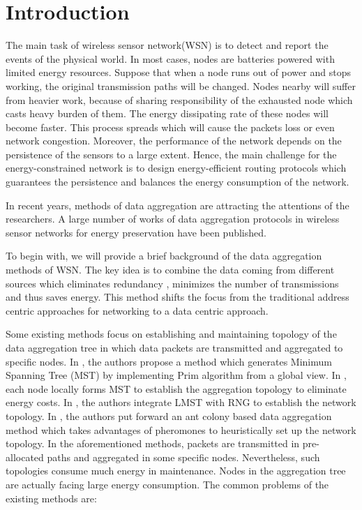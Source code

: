 \documentclass{elsarticle}
\begin{document}
\section{Introduction} \label{introduction}
The main task of wireless sensor network(WSN) \cite{label-19, label-20} is to detect and report the events of the physical world. In most cases, nodes are batteries powered \cite{label-21} with limited energy resources. Suppose that when a node runs out of power and stops working, the original transmission paths will be changed. Nodes nearby will suffer from heavier work, because of sharing responsibility of the exhausted node which casts heavy burden of them. The energy dissipating rate of these nodes will become faster. This process spreads which will cause the packets loss or even network congestion. Moreover, the performance of the network depends on the persistence of the sensors to a large extent. Hence, the main challenge for the energy-constrained network is to design energy-efficient routing protocols \cite{label-1, label-2, label-3, label-4, label-5} which guarantees the persistence and balances the energy consumption of the network.

In recent years, methods of data aggregation \cite{label-16} are attracting the attentions of the researchers. A large number of works of data aggregation protocols in wireless sensor networks for energy preservation have been published.

To begin with, we will provide a brief background of the data aggregation methods of WSN. The key idea is to combine the data coming from different sources which eliminates redundancy \cite{label-33}, minimizes the number of transmissions and thus saves energy. This method shifts the focus from the traditional address centric approaches for networking to a data centric approach.

Some existing methods \cite{label-6,label-7,label-8,label-10} focus on establishing and maintaining topology of the data aggregation tree in which data packets are transmitted and aggregated to specific nodes. In \cite{label-6}, the authors propose a method which generates Minimum Spanning Tree (MST) by implementing Prim algorithm from a global view. In \cite{label-7}, each node locally forms MST to establish the aggregation topology to eliminate energy costs. In \cite{label-8}, the authors integrate LMST with RNG\cite{label-9} to establish the network topology. In \cite{label-10}, the authors put forward an ant colony based data aggregation method which takes advantages of pheromones to heuristically set up the network topology. In the aforementioned methods, packets are transmitted in pre-allocated paths and aggregated in some specific nodes. Nevertheless, such topologies consume much energy in maintenance. Nodes in the aggregation tree are actually facing large energy consumption. The common problems of the existing methods are:
\end{document}
